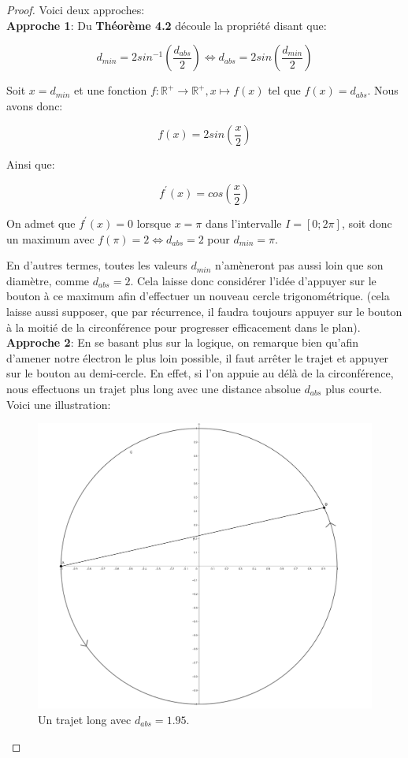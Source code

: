 \documentclass{amsart}
\theoremstyle{definition}
\theoremstyle{remark}
\numberwithin{equation}{section}
\begin{document}
\begin{proof}
  Voici deux approches:\\
  
  \textbf{Approche 1}: Du \textbf{Théorème 4.2} découle la propriété disant que: 

  \[d_{min}=2sin^{-1}(\frac{d_{abs}}{2}) \Leftrightarrow d_{abs}=2sin(\frac{d_{min}}{2})\]

  Soit $x=d_{min}$ et une fonction $f:\mathbb{R^+}\longrightarrow \mathbb{R^+}, x\longmapsto f(x)$ tel que  $f(x)=d_{abs}$. Nous avons donc:

  \[f(x)=2sin(\frac{x}{2})\]

  Ainsi que:

  \[f^\prime(x)=cos(\frac{x}{2})\]

  On admet que $f^\prime(x)=0$ lorsque $x=\pi$ dans l'intervalle $I=[0;2\pi]$, soit donc un maximum avec $f(\pi)=2 \Leftrightarrow d_{abs}=2$ pour $d_{min}=\pi$. 

  En d'autres termes, toutes les valeurs $d_{min}$ n'amèneront pas aussi loin que son diamètre, comme $d_{abs}=2$. Cela laisse donc considérer l'idée d'appuyer sur le bouton à ce maximum afin d'effectuer un nouveau cercle trigonométrique. 
  (cela laisse aussi supposer, que par récurrence, il faudra toujours appuyer sur le bouton à la moitié de la circonférence pour progresser efficacement dans le plan).\\

  \textbf{Approche 2}: En se basant plus sur la logique, on remarque bien qu'afin d'amener notre électron le plus loin possible, il faut arrêter le trajet et appuyer sur le bouton
  au demi-cercle. En effet, si l'on appuie au délà de la circonférence, nous effectuons un trajet plus long avec une distance absolue $d_{abs}$ plus courte. Voici une illustration:

  \begin{figure}[H]
    \centering
    \includegraphics[scale=0.13]{ab_circle1.png}
    \caption{Un trajet long avec $d_{abs}=1.95$.}
  \end{figure}


\end{proof}
\end{document}
